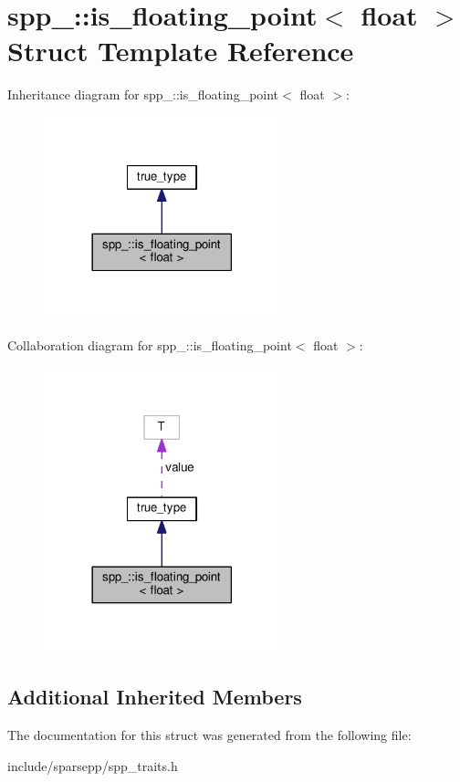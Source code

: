 \hypertarget{structspp___1_1is__floating__point_3_01float_01_4}{}\section{spp\+\_\+\+:\+:is\+\_\+floating\+\_\+point$<$ float $>$ Struct Template Reference}
\label{structspp___1_1is__floating__point_3_01float_01_4}


Inheritance diagram for spp\+\_\+\+:\+:is\+\_\+floating\+\_\+point$<$ float $>$\+:\nopagebreak
\begin{figure}[H]
\begin{center}
\leavevmode
\includegraphics[width=194pt]{structspp___1_1is__floating__point_3_01float_01_4__inherit__graph}
\end{center}
\end{figure}


Collaboration diagram for spp\+\_\+\+:\+:is\+\_\+floating\+\_\+point$<$ float $>$\+:\nopagebreak
\begin{figure}[H]
\begin{center}
\leavevmode
\includegraphics[width=194pt]{structspp___1_1is__floating__point_3_01float_01_4__coll__graph}
\end{center}
\end{figure}
\subsection*{Additional Inherited Members}


The documentation for this struct was generated from the following file\+:\begin{DoxyCompactItemize}
\item 
include/sparsepp/spp\+\_\+traits.\+h\end{DoxyCompactItemize}
